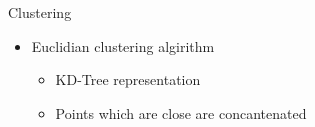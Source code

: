 
\begin{frame}{Clustering}
	\begin{itemize}
	\item Euclidian clustering algirithm
	\begin{itemize}
	\item KD-Tree representation
	\item Points which are close are concantenated 
	\end{itemize}
	\end{itemize}
\end{frame}
